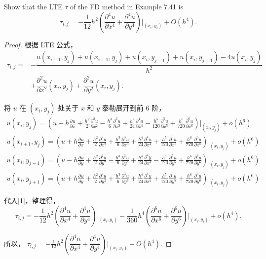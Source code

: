 \documentclass[lang=cn,a4paper,newtx,bibend=bibtex]{elegantpaper}
\newcommand{\apart}[3]{\frac{\partial^{#3}{#1}}{\partial {#2}^{#3}}}
\begin{document}
\begin{prob}[Exercise 7.42]
  Show that the LTE $\tau$ of the FD method in 
  Example 7.41 is
  \[\tau_{i, j} = -\frac{1}{12} h^2 \left(\dfrac{\partial^4 u}{\partial x^4} + 
  \dfrac{\partial^4 u}{\partial y^4}\right)\bigg|_{(x_i, y_i)} + O(h^4).\]
\end{prob}

\begin{proof}
  根据 LTE 公式，
  \begin{equation}
  \begin{aligned}
  \tau_{i,j} = &- \dfrac{u(x_{i-1}, y_j) + u(x_{i+1}, y_j) + u(x_i, y_{j-1}) + u(x_i, y_{j+1}) - 4u(x_i, y_j)}{h^2}  \\
  &+ \dfrac{\partial^2 u}{\partial x^2} (x_i, y_j) + \dfrac{\partial^2 u}{\partial y^2} (x_i, y_j).
  \label{1}
  \end{aligned}
  \end{equation}

  将 $u$ 在 $(x_i, y_j)$ 处关于 $x$ 和 $y$ 泰勒展开到前 6 阶，
  \begin{equation*}
  \begin{aligned}
  u(x_i, y_j)     = \left(u - h\apart{u}{x}{} + \frac{h^2}{2} \apart{u}{x}{2} - \frac{h^3}6\apart{u}{x}{3} + \frac{h^4}{24}\apart{u}{x}{4} - \frac{h^5}{120} \apart{u}{x}{5} + \frac{h^6}{720} \apart{u}{x}{6} \right)\bigg|_{(x_i, y_j)} + o(h^6) \\
  u(x_{i+1}, y_j) = \left(u + h\apart{u}{x}{} + \frac{h^2}{2} \apart{u}{x}{2} + \frac{h^3}6\apart{u}{x}{3} + \frac{h^4}{24}\apart{u}{x}{4} + \frac{h^5}{120} \apart{u}{x}{5} + \frac{h^6}{720} \apart{u}{x}{6} \right)\bigg|_{(x_i, y_j)} + o(h^6) \\
  u(x_i, y_{j-1}) = \left(u - h\apart{u}{y}{} + \frac{h^2}{2} \apart{u}{y}{2} - \frac{h^3}6\apart{u}{y}{3} + \frac{h^4}{24}\apart{y}{x}{4} - \frac{h^5}{120} \apart{u}{y}{5} + \frac{h^6}{720} \apart{u}{y}{6} \right)\bigg|_{(x_i, y_j)} + o(h^6) \\
  u(x_i, y_{j+1}) = \left(u + h\apart{u}{y}{} + \frac{h^2}{2} \apart{u}{y}{2} + \frac{h^3}6\apart{u}{y}{3} + \frac{h^4}{24}\apart{y}{x}{4} + \frac{h^5}{120} \apart{u}{y}{5} + \frac{h^6}{720} \apart{u}{y}{6} \right)\bigg|_{(x_i, y_j)} + o(h^6)
  \end{aligned}
  \end{equation*} 
  
  代入\eqref{1}，整理得，
  \[\tau_{i,j} = -\dfrac1{12} h^2 \left(\apart{u}{x}{4} + \apart{u}{y}{4}\right)\bigg|_{(x_i, y_i)} - \dfrac1{360}h^4\left(\apart{u}{x}{6} + \apart{u}{y}{6}\right)\bigg|_{(x_i, y_i)} + o(h^4).\]
  
  所以，
  $\tau_{i, j} = -\frac{1}{12} h^2 \left(\dfrac{\partial^4 u}{\partial x^4} + 
    \dfrac{\partial^4 u}{\partial y^4}\right)\bigg|_{(x_i, y_i)} + O(h^4).$
  \end{proof}
\end{document}
